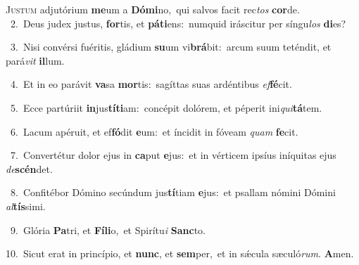 \lettrine{\initial\textcolor{\initialcolor}{J}}{ustum} adjutórium \textbf{me}\-um a \textbf{Dó}\-\textbf{mi}no,~\star qui salvos facit rec\textit{tos} \textbf{cor}\-de.\\
{\numbfont\textcolor{\numbcolor}{~2.}}~Deus judex justus, \textbf{for}\-tis, et \textbf{pá}\-\textbf{ti}ens:~\star numquid iráscitur per síngu\textit{los} \textbf{di}\-es?\par
{\numbfont\textcolor{\numbcolor}{~3.}}~Nisi convérsi fuéritis, gládium \textbf{su}\-um vi\-\textbf{brá}\-bit:~\star arcum suum teténdit, et pará\textit{vit} \textbf{il}\-lum.\par
{\numbfont\textcolor{\numbcolor}{~4.}}~Et in eo parávit \textbf{va}\-sa \textbf{mor}\-tis:~\star sagíttas suas ardéntibus \textit{ef}\-\textbf{fé}cit.\par
{\numbfont\textcolor{\numbcolor}{~5.}}~Ecce partúriit \textbf{in}\-jus\-\textbf{tí}\-\textbf{ti}am:~\star concépit dolórem, et péperit ini\-\textit{qui}\-\textbf{tá}tem.\par
{\numbfont\textcolor{\numbcolor}{~6.}}~Lacum apéruit, et ef\-\textbf{fó}\-dit \textbf{e}\-um:~\star et íncidit in fóveam \textit{quam} \textbf{fe}\-cit.\par
{\numbfont\textcolor{\numbcolor}{~7.}}~Convertétur dolor ejus in \textbf{ca}\-put \textbf{e}\-jus:~\star et in vérticem ipsíus iníquitas ejus \textit{de}\-\textbf{scén}det.\par
{\numbfont\textcolor{\numbcolor}{~8.}}~Confitébor Dómino secúndum jus\-\textbf{tí}\-tiam \textbf{e}\-jus:~\star et psallam nómini Dómini \textit{al}\-\textbf{tís}simi.\par
{\numbfont\textcolor{\numbcolor}{~9.}}~Glória \textbf{Pa}\-tri, et \textbf{Fí}\-\textbf{li}o,~\star et Spirítu\textit{i} \textbf{Sanc}\-to.\par
{\numbfont\textcolor{\numbcolor}{10.}}~Sicut erat in princípio, et \textbf{nunc}\-, et \textbf{sem}\-per,~\star et in sǽcula sæculó\-\textit{rum}\-. \textbf{A}\-men.\par
